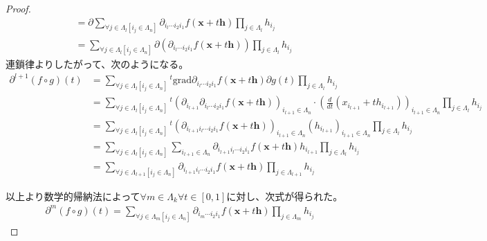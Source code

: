 \documentclass[dvipdfmx]{jsarticle}
\begin{document}
\begin{proof}
\begin{align*}
&= \partial\sum_{\forall j \in \varLambda_{l}\left[ i_{j} \in \varLambda_{n} \right]} {\partial_{i_{l}\cdots i_{2}i_{1}}f\left( \mathbf{x} + t\mathbf{h} \right)\prod_{j \in \varLambda_{l}} h_{i_{j}}}\\
&= \sum_{\forall j \in \varLambda_{l}\left[ i_{j} \in \varLambda_{n} \right]} {\partial\left( \partial_{i_{l}\cdots i_{2}i_{1}}f\left( \mathbf{x} + t\mathbf{h} \right) \right)\prod_{j \in \varLambda_{l}} h_{i_{j}}}
\end{align*}
連鎖律よりしたがって、次のようになる。
\begin{align*}
\partial^{l + 1}(f \circ g)(t) &= \sum_{\forall j \in \varLambda_{l}\left[ i_{j} \in \varLambda_{n} \right]} {{}^{t}\mathrm{grad}{\partial_{i_{l}\cdots i_{2}i_{1}}f}\left( \mathbf{x} + t\mathbf{h} \right)\partial g(t)\prod_{j \in \varLambda_{l}} h_{i_{j}}}\\
&= \sum_{\forall j \in \varLambda_{l}\left[ i_{j} \in \varLambda_{n} \right]} {{}^{t}\left( \partial_{i_{l + 1}}\partial_{i_{l}\cdots i_{2}i_{1}}f\left( \mathbf{x} + t\mathbf{h} \right) \right)_{i_{l + 1} \in \varLambda_{n}} \cdot \left( \frac{d}{dt}\left( x_{i_{l + 1}} + th_{i_{l + 1}} \right) \right)_{i_{l + 1} \in \varLambda_{n}}\prod_{j \in \varLambda_{l}} h_{i_{j}}}\\
&= \sum_{\forall j \in \varLambda_{l}\left[ i_{j} \in \varLambda_{n} \right]} {{}^{t}\left( \partial_{i_{l + 1}i_{l}\cdots i_{2}i_{1}}f\left( \mathbf{x} + t\mathbf{h} \right) \right)_{i_{l + 1} \in \varLambda_{n}}\left( h_{i_{l + 1}} \right)_{i_{l + 1} \in \varLambda_{n}}\prod_{j \in \varLambda_{l}} h_{i_{j}}}\\
&= \sum_{\forall j \in \varLambda_{l}\left[ i_{j} \in \varLambda_{n} \right]} {\sum_{i_{l + 1} \in \varLambda_{n}} {\partial_{i_{l + 1}i_{l}\cdots i_{2}i_{1}}f\left( \mathbf{x} + t\mathbf{h} \right)h_{i_{l + 1}}}\prod_{j \in \varLambda_{l}} h_{i_{j}}}\\
&= \sum_{\forall j \in \varLambda_{l + 1}\left[ i_{j} \in \varLambda_{n} \right]} {\partial_{i_{l + 1}i_{l}\cdots i_{2}i_{1}}f\left( \mathbf{x} + t\mathbf{h} \right)\prod_{j \in \varLambda_{l + 1}} h_{i_{j}}}
\end{align*}\par
以上より数学的帰納法によって$\forall m \in \varLambda_{k}\forall t \in [ 0,1]$に対し、次式が得られた。
\begin{align*}
\partial^{m}(f \circ g)(t) = \sum_{\forall j \in \varLambda_{m}\left[ i_{j} \in \varLambda_{n} \right]} {\partial_{i_{m}\cdots i_{2}i_{1}}f\left( \mathbf{x} + t\mathbf{h} \right)\prod_{j \in \varLambda_{m}} h_{i_{j}}}
\end{align*}
\end{proof}
\end{document}
